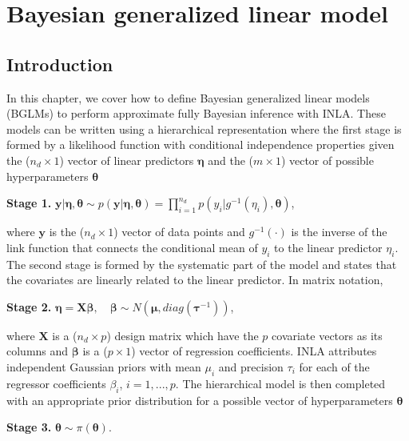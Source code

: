 \documentclass[a4paper,11pt]{report}
\def\bs#1{\ensuremath{\boldsymbol{#1}}} %
\begin{document}
\chapter{}



\clearpage




\chapter{Bayesian generalized linear model}

\section{Introduction}\label{bglm:sec:intro}

In this chapter, we cover how to define Bayesian generalized linear
models (BGLMs) to perform approximate fully Bayesian inference with
INLA. These models can be written using a hierarchical representation
where the first stage is formed by a likelihood function with
conditional independence properties given the ($n_d \times 1$) vector
of linear predictors $\bs{\eta}$ and the ($m \times 1$) vector of
possible hyperparameters $\bs{\theta}$
\begin{list}{}{\leftmargin=5em}
\item[\textbf{Stage 1.}] $\bs{y}|\bs{\eta},\bs{\theta} \sim
    p(\bs{y}|\bs{\eta},\bs{\theta}) = \prod _{i=1}^{n_d} p(y_i|g^{-1}
    (\eta _i), \bs{\theta})$,
\end{list}
where $\bs{y}$ is the ($n_d \times 1$) vector of data points and
$g^{-1}(\cdot)$ is the inverse of the link function that connects the
conditional mean of $y_i$ to the linear predictor $\eta _i$.  The
second stage is formed by the systematic part of the model and states
that the covariates are linearly related to the linear predictor. In
matrix notation,
\begin{list}{}{\leftmargin=5em}
\item[\textbf{Stage 2.}] $\bs{\eta} = \bs{X} \bs{\beta}, \quad
    \bs{\beta} \sim N(\bs{\mu}, diag(\bs{\tau}^{-1}))$,
\end{list}
where $\bs{X}$ is a ($n_d \times p$) design matrix which have the $p$
covariate vectors as its columns and $\bs{\beta}$ is a ($p \times 1$)
vector of regression coefficients. INLA attributes independent
Gaussian priors with mean $\mu _i$ and precision $\tau_i$ for each of
the regressor coefficients $\beta_i$, $i = 1,...,p$.  The hierarchical
model is then completed with an appropriate prior distribution for a
possible vector of hyperparameters $\bs{\theta}$
\begin{list}{}{\leftmargin=5em}
  \item[\textbf{Stage 3.}] $\bs{\theta} \sim \pi(\bs{\theta})$.
\end{list}
\end{document}
